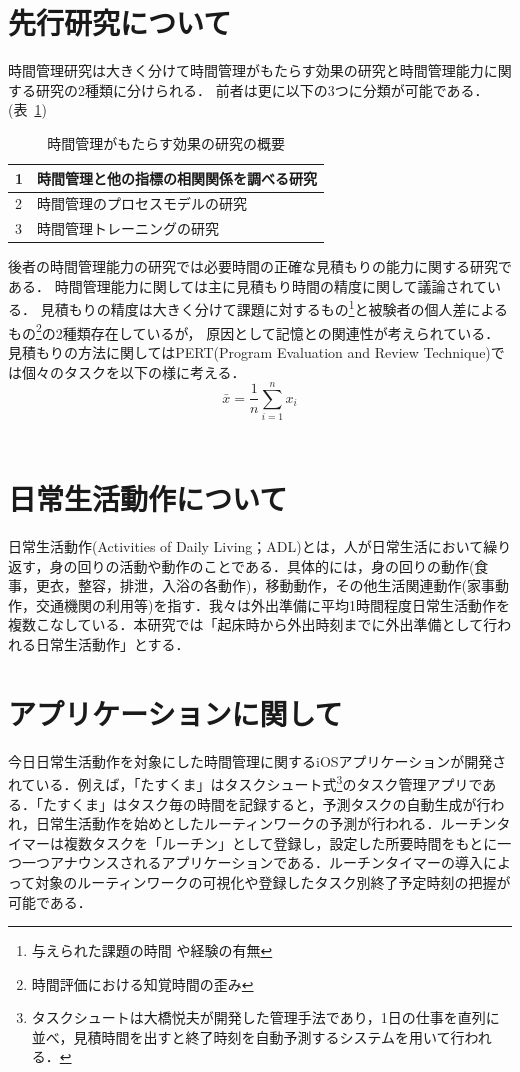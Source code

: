 \section{先行研究について}
時間管理研究は大きく分けて時間管理がもたらす効果の研究と時間管理能力に関する研究の2種類に分けられる．
前者は更に以下の3つに分類が可能である．(表~\ref{tb:senko})
\begin{table}[htb]
\begin{center}
  \begin{tabular}{|l|l|} \hline
   1 & 時間管理と他の指標の相関関係を調べる研究 \\ \hline
   2 & 時間管理のプロセスモデルの研究 \\ \hline
   3 & 時間管理トレーニングの研究 \\ \hline
  \end{tabular}
  \caption{時間管理がもたらす効果の研究の概要}
  \label{tb:senko}
\end{center}
\end{table}

後者の時間管理能力の研究では必要時間の正確な見積もりの能力に関する研究である．
時間管理能力に関しては主に見積もり時間の精度に関して議論されている．
見積もりの精度は大きく分けて課題に対するもの\footnote{与えられた課題の時間 \cite{Roy2008}や経験の有無\cite{Roy2007}}と被験者の個人差によるもの\footnote{時間評価における知覚時間の歪み\cite{Oguro1961}\cite{Murakami2016}}の2種類存在しているが，
原因として記憶との関連性が考えられている\cite{Roy2005}．
見積もりの方法に関してはPERT(Program Evaluation and Review Technique)では個々のタスクを以下の様に考える．
\[ \bar{x}=\frac{1}{n}\displaystyle\sum_{i=1}^{n}x_{i}\]　%

\section{日常生活動作について}
日常生活動作(Activities of Daily Living；ADL)とは，人が日常生活において繰り返す，身の回りの活動や動作のことである．具体的には，身の回りの動作(食事，更衣，整容，排泄，入浴の各動作)，移動動作，その他生活関連動作(家事動作，交通機関の利用等)を指す\cite{Sakai2003}．我々は外出準備に平均1時間程度日常生活動作を複数こなしている\cite{duhouse}．本研究では「起床時から外出時刻までに外出準備として行われる日常生活動作」とする．

\section{アプリケーションに関して}
今日日常生活動作を対象にした時間管理に関するiOSアプリケーションが開発されている．例えば，「たすくま」はタスクシュート式\footnote{タスクシュートは大橋悦夫が開発した管理手法であり，1日の仕事を直列に並べ，見積時間を出すと終了時刻を自動予測するシステムを用いて行われる．}のタスク管理アプリである\cite{Taskuma}．「たすくま」はタスク毎の時間を記録すると，予測タスクの自動生成が行われ，日常生活動作を始めとしたルーティンワークの予測が行われる．ルーチンタイマーは複数タスクを「ルーチン」として登録し，設定した所要時間をもとに一つ一つアナウンスされるアプリケーションである\cite{RoutineTimer}．ルーチンタイマーの導入によって対象のルーティンワークの可視化や登録したタスク別終了予定時刻の把握が可能である．


